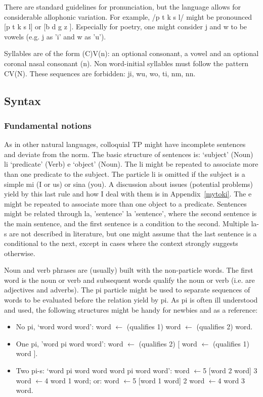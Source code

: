 There are standard guidelines for pronunciation,
but the language allows for considerable allophonic
variation.
For example, /p t k s l/ might be pronounced
[p t k s l] or [b d g z ].%
Especially for poetry, one might consider
j and w to be vowels
(e.g. j as 'i' and w as 'u').

Syllables are of the form (C)V(n):
an optional consonant, a vowel and an optional coronal nasal consonant
(n).
Non word-initial syllables must follow the pattern CV(N).
These sequences are forbidden: ji, wu, wo, ti, nm, nn.

\subsection{Syntax}\label{syntax}
\subsubsection{Fundamental notions}
As in other natural languages, 
colloquial TP might have
incomplete sentences and deviate from the
norm.
The basic structure of sentences is:
`subject' (Noun) li `predicate' (Verb) e `object' (Noun).
The li might be repeated to associate more than
one predicate to the subject.
The particle li is omitted if the subject is a simple mi (I or us)
or sina (you). A discussion about issues (potential problems)
yield by this last rule
and how I deal with them is in Appendix~\ref{mytoki}.
The e might be repeated to associate more than
one object to a predicate.
Sentences might be related through la,
'sentence' la 'sentence', where the second sentence is
the main sentence, and the first sentence is a condition
to the second.
Multiple la-s are not described in literature,
but one might assume that the last sentence
is a conditional to the next,
except in cases where the context strongly suggests
otherwise.

Noun and verb phrases are (usually) built with the non-particle words.
The first word is the noun or verb and subsequent words
qualify the noun or verb (i.e. are adjectives and adverbs).
The pi particle might be used to separate sequences of words
to be evaluated before the relation yield by pi.
As pi is often ill understood and used,
the following structures might be handy for newbies and as a
reference:
\begin{itemize}
  \item No pi, `word word word':
word $\leftarrow$ (qualifies 1) word $\leftarrow$ (qualifies 2)  word.
  \item One pi, 'word pi word word': word $\leftarrow$ (qualifies 2) [
      word $\leftarrow$ (qualifies 1)  word ].
  \item Two pi-s: `word pi word word word pi word word':
    word $\leftarrow$5 [word 2 word] 3 word $\leftarrow$4 word 1  word;
or:
    word $\leftarrow$5 [word 1 word] 2 word $\leftarrow$4 word 3  word.
\end{itemize}

